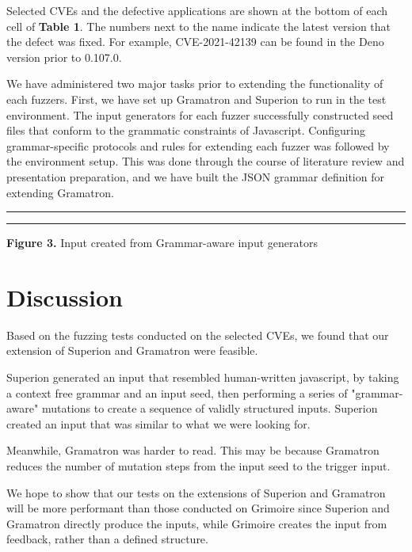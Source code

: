 \documentclass[12pt]{diazessay}
\begin{document}
Selected CVEs and the defective applications are shown at the bottom of each cell of \textbf{Table 1}. The numbers next to the name indicate the latest version that the defect was fixed. For example, CVE-2021-42139 can be found in the Deno version prior to 0.107.0.


We have administered two major tasks prior to extending the functionality of each fuzzers.
First, we have set up Gramatron and Superion to run in the test environment.
The input generators for each fuzzer successfully constructed seed files \cite{superion-example}\cite{gramatron-example}that conform to the grammatic constraints of Javascript.
Configuring grammar-specific protocols and rules for extending each fuzzer was followed by the environment setup.
This was done through the course of literature review and presentation preparation, and we have built the JSON grammar definition\cite{json-source.json} for extending Gramatron.

\vspace{12mm}
\hrule height 0.4mm
\begingroup \fontsize{12pt}{12pt} \selectfont \begin{alltt}

\end{alltt} \vspace{-6mm} \endgroup \hrule height 0.4mm
\vspace{6mm}
\centerline{\textbf{Figure 3.} Input created from Grammar-aware input generators}
\vspace{6mm}


\section*{Discussion}

Based on the fuzzing tests conducted on the selected CVEs, we found that our extension of Superion and Gramatron were feasible. 

Superion generated an input that resembled human-written javascript, by taking a context free grammar and an input seed,
then performing a series of "grammar-aware" mutations to create a sequence of validly structured inputs.
Superion created an input that was similar to what we were looking for. 

Meanwhile, Gramatron was harder to read.
This may be because Gramatron reduces the number of mutation steps from the input seed to the trigger input. 

We hope to show that our tests on the extensions of Superion and Gramatron will be more performant than those conducted on Grimoire since Superion and Gramatron directly produce the inputs,
while Grimoire creates the input from feedback, rather than a defined structure.
\end{document}
